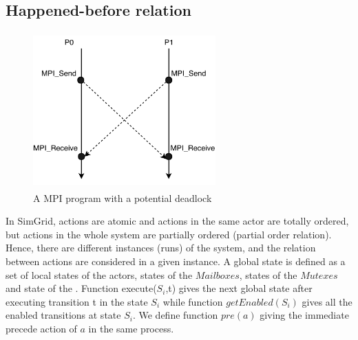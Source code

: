 \documentclass[a4paper,11pt]{article}
\begin{document}
\subsection{Happened-before relation}
\begin{figure}[H]
	\label{fig:cycle_dependency}

		\centerline{\includegraphics[width=7cm,height=6cm]{mpiPro.pdf}}

	\caption{A MPI program with a potential deadlock}
\end{figure}
In SimGrid, actions are atomic and actions in the same actor are totally ordered, but actions in the whole system are partially ordered (partial order relation).  Hence, there are different instances (runs) of the system, and the relation between actions are  considered in a given instance. A global state is defined as a set of local states of the actors, states of the $Mailboxes$, states of the $Mutexes$ and state of the \Communications. Function execute($S_i$,t)  gives the next global state after executing transition t in the state $S_i$ while function $getEnabled(S_i)$
gives all the enabled transitions at state $S_i$. We define function $pre(a)$ giving the immediate precede action of $a$ in the same process.\\
\end{document}
